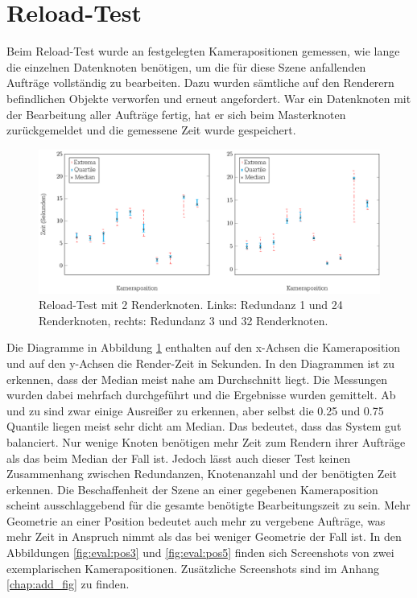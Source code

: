 \section{Reload-Test}
\label{sec:eval:reload}
Beim Reload-Test wurde an festgelegten Kamerapositionen gemessen, wie lange die einzelnen Datenknoten benötigen, um die für diese Szene anfallenden Aufträge vollständig zu bearbeiten. Dazu wurden sämtliche auf den Renderern befindlichen Objekte verworfen und erneut angefordert. War ein Datenknoten mit der Bearbeitung aller Aufträge fertig, hat er sich beim Masterknoten zurückgemeldet und die gemessene Zeit wurde gespeichert.
\begin{figure}
\centering
\includegraphics[scale=0.75]{images/diag_reload.pdf}
  \caption{\label{fig:eval:reload}Reload-Test mit 2 Renderknoten. Links: Redundanz 1 und 24 Renderknoten, rechts: Redundanz 3 und 32 Renderknoten.}
\end{figure}
Die Diagramme in Abbildung \ref{fig:eval:reload} enthalten auf den x-Achsen die Kameraposition und auf den y-Achsen die Render-Zeit in Sekunden. In den Diagrammen ist zu erkennen, dass der Median meist nahe am Durchschnitt liegt. Die Messungen wurden dabei mehrfach durchgeführt und die Ergebnisse wurden gemittelt. Ab und zu sind zwar einige Ausreißer zu erkennen, aber selbst die 0.25 und 0.75 Quantile liegen meist sehr dicht am Median. Das bedeutet, dass das System gut balanciert. Nur wenige Knoten benötigen mehr Zeit zum Rendern ihrer Aufträge als das beim Median der Fall ist. Jedoch lässt auch dieser Test keinen Zusammenhang zwischen Redundanzen, Knotenanzahl und der benötigten Zeit erkennen. Die Beschaffenheit der Szene an einer gegebenen Kameraposition scheint ausschlaggebend für die gesamte benötigte Bearbeitungszeit zu sein. Mehr Geometrie an einer Position bedeutet auch mehr zu vergebene Aufträge, was mehr Zeit in Anspruch nimmt als das bei weniger Geometrie der Fall ist. In den Abbildungen \ref{fig:eval:pos3} und \ref{fig:eval:pos5} finden sich Screenshots von zwei exemplarischen Kamerapositionen. Zusätzliche Screenshots sind im Anhang \ref{chap:add_fig} zu finden.
